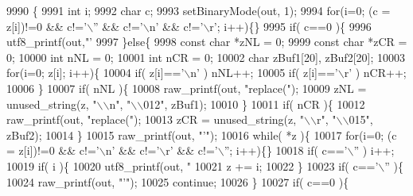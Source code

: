 \begin{DoxyCode}
9990                                                                   \{
9991   \textcolor{keywordtype}{int} i;
9992   \textcolor{keywordtype}{char} c;
9993   setBinaryMode(out, 1);
9994   \textcolor{keywordflow}{for}(i=0; (c = z[i])!=0 && c!=\textcolor{charliteral}{'\(\backslash\)''} && c!=\textcolor{charliteral}{'\(\backslash\)n'} && c!=\textcolor{charliteral}{'\(\backslash\)r'}; i++)\{\}
9995   \textcolor{keywordflow}{if}( c==0 )\{
9996     utf8_printf(out,\textcolor{stringliteral}{"'%
9997   \}\textcolor{keywordflow}{else}\{
9998     \textcolor{keyword}{const} \textcolor{keywordtype}{char} *zNL = 0;
9999     \textcolor{keyword}{const} \textcolor{keywordtype}{char} *zCR = 0;
10000     \textcolor{keywordtype}{int} nNL = 0;
10001     \textcolor{keywordtype}{int} nCR = 0;
10002     \textcolor{keywordtype}{char} zBuf1[20], zBuf2[20];
10003     \textcolor{keywordflow}{for}(i=0; z[i]; i++)\{
10004       \textcolor{keywordflow}{if}( z[i]==\textcolor{charliteral}{'\(\backslash\)n'} ) nNL++;
10005       \textcolor{keywordflow}{if}( z[i]==\textcolor{charliteral}{'\(\backslash\)r'} ) nCR++;
10006     \}
10007     \textcolor{keywordflow}{if}( nNL )\{
10008       raw_printf(out, \textcolor{stringliteral}{"replace("});
10009       zNL = unused_string(z, \textcolor{stringliteral}{"\(\backslash\)\(\backslash\)n"}, \textcolor{stringliteral}{"\(\backslash\)\(\backslash\)012"}, zBuf1);
10010     \}
10011     \textcolor{keywordflow}{if}( nCR )\{
10012       raw_printf(out, \textcolor{stringliteral}{"replace("});
10013       zCR = unused_string(z, \textcolor{stringliteral}{"\(\backslash\)\(\backslash\)r"}, \textcolor{stringliteral}{"\(\backslash\)\(\backslash\)015"}, zBuf2);
10014     \}
10015     raw_printf(out, \textcolor{stringliteral}{"'"});
10016     \textcolor{keywordflow}{while}( *z )\{
10017       \textcolor{keywordflow}{for}(i=0; (c = z[i])!=0 && c!=\textcolor{charliteral}{'\(\backslash\)n'} && c!=\textcolor{charliteral}{'\(\backslash\)r'} && c!=\textcolor{charliteral}{'\(\backslash\)''}; i++)\{\}
10018       \textcolor{keywordflow}{if}( c==\textcolor{charliteral}{'\(\backslash\)''} ) i++;
10019       \textcolor{keywordflow}{if}( i )\{
10020         utf8_printf(out, \textcolor{stringliteral}{"%
10021         z += i;
10022       \}
10023       \textcolor{keywordflow}{if}( c==\textcolor{charliteral}{'\(\backslash\)''} )\{
10024         raw_printf(out, \textcolor{stringliteral}{"'"});
10025         \textcolor{keywordflow}{continue};
10026       \}
10027       \textcolor{keywordflow}{if}( c==0 )\{
}}
\end{DoxyCode}
